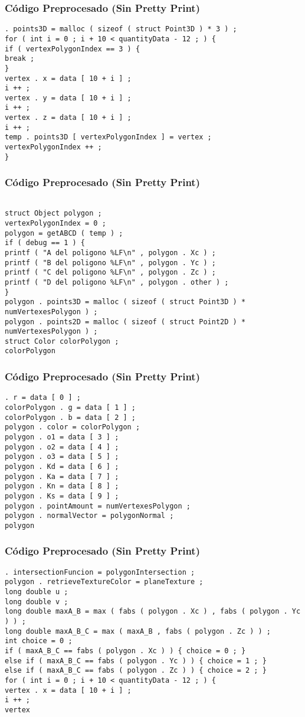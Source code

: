 \documentclass{beamer}
\begin{document}
\begin{frame}[fragile]
\frametitle{C\'odigo Preprocesado (Sin Pretty Print)}
\begin{lstlisting}[style=CStyle]
. points3D = malloc ( sizeof ( struct Point3D ) * 3 ) ; 
for ( int i = 0 ; i + 10 < quantityData - 12 ; ) { 
if ( vertexPolygonIndex == 3 ) { 
break ; 
} 
vertex . x = data [ 10 + i ] ; 
i ++ ; 
vertex . y = data [ 10 + i ] ; 
i ++ ; 
vertex . z = data [ 10 + i ] ; 
i ++ ; 
temp . points3D [ vertexPolygonIndex ] = vertex ; 
vertexPolygonIndex ++ ; 
} \end{lstlisting}
\end{frame}
\begin{frame}[fragile]
\frametitle{C\'odigo Preprocesado (Sin Pretty Print)}
\begin{lstlisting}[style=CStyle]

struct Object polygon ; 
vertexPolygonIndex = 0 ; 
polygon = getABCD ( temp ) ; 
if ( debug == 1 ) { 
printf ( "A del poligono %LF\n" , polygon . Xc ) ; 
printf ( "B del poligono %LF\n" , polygon . Yc ) ; 
printf ( "C del poligono %LF\n" , polygon . Zc ) ; 
printf ( "D del poligono %LF\n" , polygon . other ) ; 
} 
polygon . points3D = malloc ( sizeof ( struct Point3D ) * numVertexesPolygon ) ; 
polygon . points2D = malloc ( sizeof ( struct Point2D ) * numVertexesPolygon ) ; 
struct Color colorPolygon ; 
colorPolygon \end{lstlisting}
\end{frame}
\begin{frame}[fragile]
\frametitle{C\'odigo Preprocesado (Sin Pretty Print)}
\begin{lstlisting}[style=CStyle]
. r = data [ 0 ] ; 
colorPolygon . g = data [ 1 ] ; 
colorPolygon . b = data [ 2 ] ; 
polygon . color = colorPolygon ; 
polygon . o1 = data [ 3 ] ; 
polygon . o2 = data [ 4 ] ; 
polygon . o3 = data [ 5 ] ; 
polygon . Kd = data [ 6 ] ; 
polygon . Ka = data [ 7 ] ; 
polygon . Kn = data [ 8 ] ; 
polygon . Ks = data [ 9 ] ; 
polygon . pointAmount = numVertexesPolygon ; 
polygon . normalVector = polygonNormal ; 
polygon \end{lstlisting}
\end{frame}
\begin{frame}[fragile]
\frametitle{C\'odigo Preprocesado (Sin Pretty Print)}
\begin{lstlisting}[style=CStyle]
. intersectionFuncion = polygonIntersection ; 
polygon . retrieveTextureColor = planeTexture ; 
long double u ; 
long double v ; 
long double maxA_B = max ( fabs ( polygon . Xc ) , fabs ( polygon . Yc ) ) ; 
long double maxA_B_C = max ( maxA_B , fabs ( polygon . Zc ) ) ; 
int choice = 0 ; 
if ( maxA_B_C == fabs ( polygon . Xc ) ) { choice = 0 ; } 
else if ( maxA_B_C == fabs ( polygon . Yc ) ) { choice = 1 ; } 
else if ( maxA_B_C == fabs ( polygon . Zc ) ) { choice = 2 ; } 
for ( int i = 0 ; i + 10 < quantityData - 12 ; ) { 
vertex . x = data [ 10 + i ] ; 
i ++ ; 
vertex \end{lstlisting}
\end{frame}
\end{document}
